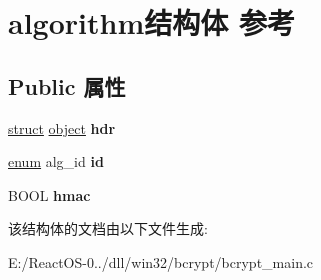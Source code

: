 \hypertarget{structalgorithm}{}\section{algorithm结构体 参考}
\label{structalgorithm}
\subsection*{Public 属性}
\begin{DoxyCompactItemize}
\item 
\mbox{\label{structalgorithm_a89338805fdcb497fdbf3369ec2b406a8}} 
\hyperlink{interfacestruct}{struct} \hyperlink{structobject}{object} {\bfseries hdr}
\item 
\mbox{\label{structalgorithm_ae538d6242c94187349e7126644b8e832}} 
\hyperlink{interfaceenum}{enum} alg\+\_\+id {\bfseries id}
\item 
\mbox{\label{structalgorithm_a26806edbd1654bf417ab5f99d2c6108e}} 
B\+O\+OL {\bfseries hmac}
\end{DoxyCompactItemize}


该结构体的文档由以下文件生成\+:\begin{DoxyCompactItemize}
\item 
E\+:/\+React\+O\+S-\/0../dll/win32/bcrypt/bcrypt\+\_\+main.\+c\end{DoxyCompactItemize}
